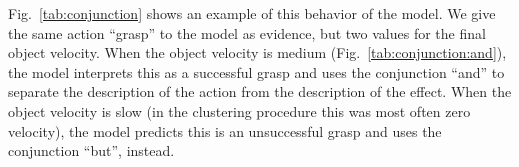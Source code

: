 Fig.~\ref{tab:conjunction} shows an example of this behavior of the model.
We give the same action ``grasp'' to the model as evidence, but two values for the final object velocity.
When the object velocity is medium (Fig.~\ref{tab:conjunction:and}), the model interprets this as a successful grasp and uses the conjunction ``and'' to separate the description of the action from the description of the effect.
When the object velocity is slow (in the clustering procedure this was most often zero velocity), the model predicts this is an unsuccessful grasp and uses the conjunction ``but'', instead.

%




